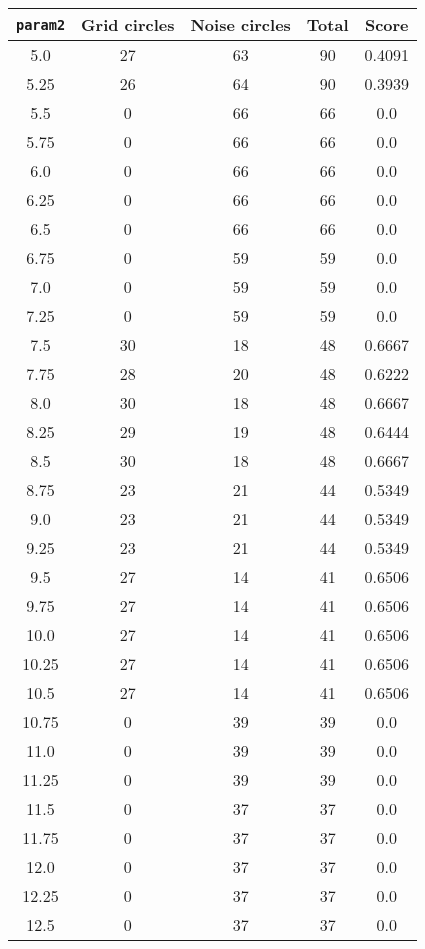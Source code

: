 \documentclass[letterpaper, 12pt]{article}
\begin{document}
\begin{longtable}{|c|c|c|c|c|}
\hline
\textbf{\texttt{param2}} & \textbf{Grid circles} & \textbf{Noise circles} & \textbf{Total} & \textbf{Score} \\
\hline
5.0 & 27 & 63 & 90 & 0.4091 \\
\hline
5.25 & 26 & 64 & 90 & 0.3939 \\
\hline
5.5 & 0 & 66 & 66 & 0.0 \\
\hline
5.75 & 0 & 66 & 66 & 0.0 \\
\hline
6.0 & 0 & 66 & 66 & 0.0 \\
\hline
6.25 & 0 & 66 & 66 & 0.0 \\
\hline
6.5 & 0 & 66 & 66 & 0.0 \\
\hline
6.75 & 0 & 59 & 59 & 0.0 \\
\hline
7.0 & 0 & 59 & 59 & 0.0 \\
\hline
7.25 & 0 & 59 & 59 & 0.0 \\
\hline
7.5 & 30 & 18 & 48 & 0.6667 \\
\hline
7.75 & 28 & 20 & 48 & 0.6222 \\
\hline
8.0 & 30 & 18 & 48 & 0.6667 \\
\hline
8.25 & 29 & 19 & 48 & 0.6444 \\
\hline
8.5 & 30 & 18 & 48 & 0.6667 \\
\hline
8.75 & 23 & 21 & 44 & 0.5349 \\
\hline
9.0 & 23 & 21 & 44 & 0.5349 \\
\hline
9.25 & 23 & 21 & 44 & 0.5349 \\
\hline
9.5 & 27 & 14 & 41 & 0.6506 \\
\hline
9.75 & 27 & 14 & 41 & 0.6506 \\
\hline
10.0 & 27 & 14 & 41 & 0.6506 \\
\hline
10.25 & 27 & 14 & 41 & 0.6506 \\
\hline
10.5 & 27 & 14 & 41 & 0.6506 \\
\hline
10.75 & 0 & 39 & 39 & 0.0 \\
\hline
11.0 & 0 & 39 & 39 & 0.0 \\
\hline
11.25 & 0 & 39 & 39 & 0.0 \\
\hline
11.5 & 0 & 37 & 37 & 0.0 \\
\hline
11.75 & 0 & 37 & 37 & 0.0 \\
\hline
12.0 & 0 & 37 & 37 & 0.0 \\
\hline
12.25 & 0 & 37 & 37 & 0.0 \\
\hline
12.5 & 0 & 37 & 37 & 0.0 \\

\end{longtable}
\end{document}
